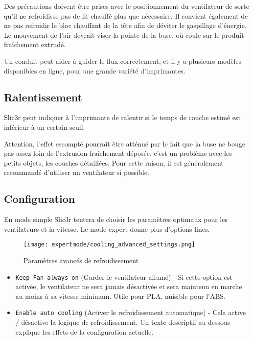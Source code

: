 Des pr\'ecautions doivent \^etre prises avec le positionnement du ventilateur de sorte qu'il ne refroidisse pas de lit chauff\'e plus que n\'ecessaire. Il convient \'egalement de ne pas refroidir le bloc chauffant de la t\^ete afin de d\'eviter le gaspillage d'\'energie. Le mouvement de l'air devrait viser la pointe de la buse, o\`u coule sur le produit fra\^ichement extrud\'e.

Un conduit peut aider \`a guider le flux correctement, et il y a plusieurs mod\`eles disponibles en ligne, pour une grande vari\'et\'e d'imprimantes.


\subsection{Ralentissement} %
\label{sub:slowing_down}
Slic3r peut indiquer \`a l'imprimante de ralentir si le temps de couche estim\'e est inf\'erieur \`a un certain seuil.

Attention, l'effet escompt\'e pourrait \^etre att\'enu\'e par le fait que la buse ne bouge pas assez loin de l'extrusion fra\^ichement d\'epos\'ee, c'est un probl\`eme avec les petits objets, les couches d\'etaill\'ees. Pour cette raison, il est g\'en\'eralement recommand\'e d'utiliser un ventilateur si possible.

\subsection{Configuration} %
\label{sub:configuring_cooling}

En mode simple Slic3r tentera de choisir les param\`etres optimaux pour les ventilateurs et la vitesse. Le mode expert donne plus d'options fines.

\begin{figure}[H]
\centering
\texttt{[image: expertmode/cooling\_advanced\_settings.png]}
\caption{Param\`etres avanc\'es de refroidissement}
\label{fig:cooling_advanced_settings}
\end{figure}

\begin{itemize}
	\item \texttt{Keep Fan always on} (Garder le ventilateur allum\'e) - Si cette option est activ\'ee, le ventilateur ne sera jamais d\'esactiv\'ee et sera maintenu en marche au moins \`a sa vitesse minimum. Utile pour PLA, nuisible pour l'ABS.
	\item \texttt{Enable auto cooling} (Activer le refroidissement automatique) - Cela active / d\'esactive la logique de refroidissement. Un texte descriptif au dessous explique les effets de la configuration actuelle.
\end{itemize}


